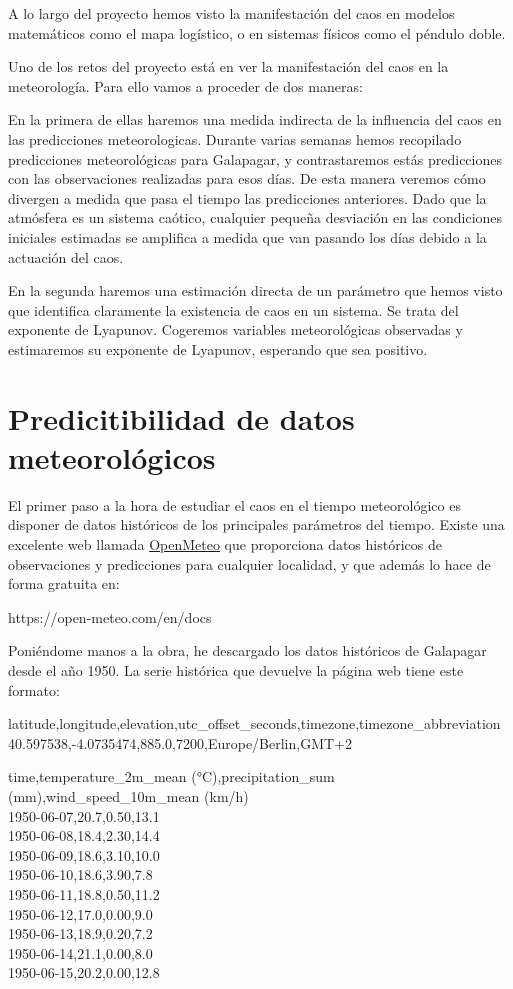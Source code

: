 \documentclass[
  11pt,
  a4paper,
  DIV=11,
  numbers=noendperiod]{scrreprt}
\begin{document}
A lo largo del proyecto hemos visto la manifestación del caos en modelos
matemáticos como el mapa logístico, o en sistemas físicos como el
péndulo doble.

Uno de los retos del proyecto está en ver la manifestación del caos en
la meteorología. Para ello vamos a proceder de dos maneras:

En la primera de ellas haremos una medida indirecta de la influencia del
caos en las predicciones meteorologicas. Durante varias semanas hemos
recopilado predicciones meteorológicas para Galapagar, y contrastaremos
estás predicciones con las observaciones realizadas para esos días. De
esta manera veremos cómo divergen a medida que pasa el tiempo las
predicciones anteriores. Dado que la atmósfera es un sistema caótico,
cualquier pequeña desviación en las condiciones iniciales estimadas se
amplifica a medida que van pasando los días debido a la actuación del
caos.

En la segunda haremos una estimación directa de un parámetro que hemos
visto que identifica claramente la existencia de caos en un sistema. Se
trata del exponente de Lyapunov. Cogeremos variables meteorológicas
observadas y estimaremos su exponente de Lyapunov, esperando que sea
positivo.

\chapter{Predicitibilidad de datos
meteorológicos}\label{predicitibilidad-de-datos-meteoroluxf3gicos}

El primer paso a la hora de estudiar el caos en el tiempo meteorológico
es disponer de datos históricos de los principales parámetros del
tiempo. Existe una excelente web llamada
\href{https://open-meteo.com/en/docs}{OpenMeteo} que proporciona datos
históricos de observaciones y predicciones para cualquier localidad, y
que además lo hace de forma gratuita en:

https://open-meteo.com/en/docs

Poniéndome manos a la obra, he descargado los datos históricos de
Galapagar desde el año 1950. La serie histórica que devuelve la página
web tiene este formato:

latitude,longitude,elevation,utc\_offset\_seconds,timezone,timezone\_abbreviation\\
40.597538,-4.0735474,885.0,7200,Europe/Berlin,GMT+2

time,temperature\_2m\_mean (°C),precipitation\_sum
(mm),wind\_speed\_10m\_mean (km/h)\\
1950-06-07,20.7,0.50,13.1\\
1950-06-08,18.4,2.30,14.4\\
1950-06-09,18.6,3.10,10.0\\
1950-06-10,18.6,3.90,7.8\\
1950-06-11,18.8,0.50,11.2\\
1950-06-12,17.0,0.00,9.0\\
1950-06-13,18.9,0.20,7.2\\
1950-06-14,21.1,0.00,8.0\\
1950-06-15,20.2,0.00,12.8
\end{document}
